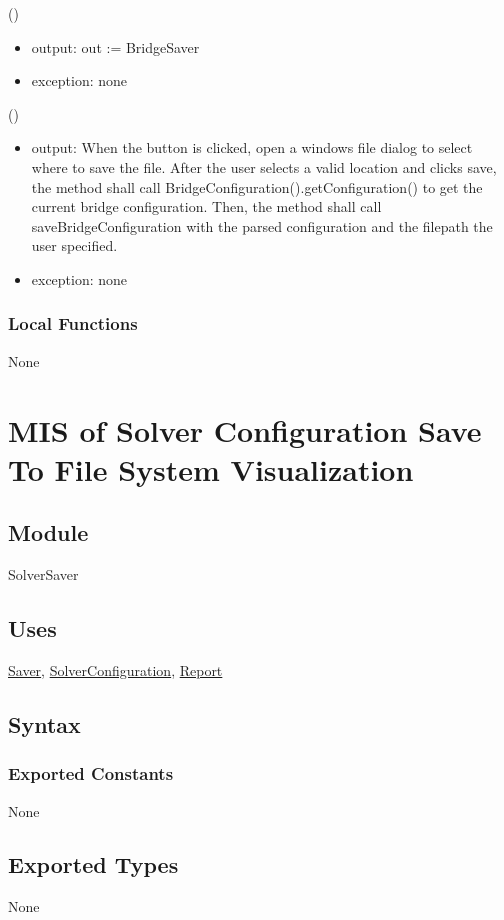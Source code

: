 \documentclass[12pt, titlepage]{article}
\begin{document}
()
\begin{itemize}
\item output: out :=  BridgeSaver
\item exception: none
\end{itemize}

()
\begin{itemize} 
\item output: When the button is clicked, open a windows file dialog to select where to save the file. After the user selects a valid location and clicks save, the method shall call BridgeConfiguration().getConfiguration() to get the current bridge configuration. Then, the method shall call saveBridgeConfiguration with the parsed configuration and the filepath the user specified.
\item exception: none
\end{itemize}

\subsubsection{Local Functions}
None
\newpage
\section{MIS of Solver Configuration Save To File System Visualization} \label{SolverSaver}

\subsection{Module}

SolverSaver

\subsection{Uses}
\hyperref[Saver]{Saver}, \hyperref[SolverConfiguration]{SolverConfiguration}, \hyperref[Report]{Report}

\subsection{Syntax}

\subsubsection{Exported Constants}
None
\subsection{Exported Types}
None
\end{document}
